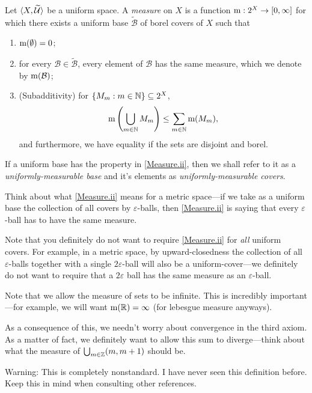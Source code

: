 \begin{dfn}[Measure]\label{measure}
Let $\langle X,\widetilde{\mathcal{U}}\rangle$ be a uniform space.  A \emph{measure} on $X$ is a function $\mathrm{m} :2^X\rightarrow [0,\infty ]$ for which there exists a uniform base $\widetilde{\mathcal{B}}$ of borel covers of $X$ such that
\begin{enumerate}
\item \label{Measure.i}$\mathrm{m} (\emptyset )=0$;
\item \label{Measure.ii}for every $\mathcal{B}\in \widetilde{\mathcal{B}}$, every element of $\mathcal{B}$ has the same measure, which we denote by $\mathrm{m} (\mathcal{B})$;
\item (Subadditivity)\label{Measure.iii} for $\{ M_m:m\in \mathbb{N} \} \subseteq 2^X$,
\begin{equation}
\mathrm{m} \left( \bigcup _{m\in \mathbb{N}}M_m\right) \leq \sum _{m\in \mathbb{N}}\mathrm{m} (M_m),
\end{equation}
and furthermore, we have equality if the sets are disjoint and borel.
\end{enumerate}
\begin{rmk}
If a uniform base has the property in \ref{Measure.ii}, then we shall refer to it as a \emph{uniformly-measurable base} and it's elements as \emph{uniformly-measurable covers}.
\end{rmk}
\begin{rmk}
Think about what \ref{Measure.ii} means for a metric space---if we take as a uniform base the collection of all covers by $\varepsilon$-balls, then \ref{Measure.ii} is saying that every $\varepsilon$-ball has to have the same measure.
\end{rmk}
\begin{rmk}
Note that you definitely do not want to require \ref{Measure.ii} for \emph{all} uniform covers.  For example, in a metric space, by upward-closedness the collection of all $\varepsilon$-balls together with a single $2\varepsilon$-ball will also be a uniform-cover---we definitely do not want to require that a $2\varepsilon$ ball has the same measure as an $\varepsilon$-ball.
\end{rmk}
\begin{rmk}
Note that we allow the measure of sets to be infinite.  This is incredibly important---for example, we will want $\mathrm{m} (\mathbb{R} )=\infty$ (for lebesgue measure anyways).
\end{rmk}
\begin{rmk}
As a consequence of this, we needn't worry about convergence in the third axiom.  As a matter of fact, we definitely want to allow this sum to diverge---think about what the measure of $\bigcup _{m\in \mathbb{Z}}(m,m+1)$ should be.
\end{rmk}
\begin{rmk}
Warning:  This is completely nonstandard.  I have never seen this definition before.  Keep this in mind when consulting other references.
\end{rmk}
\end{dfn}
